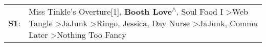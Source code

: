 \begin{supertabular}{p{0.03\textwidth}p{0.92\textwidth}}
 \textbf{S1}:  &  Miss Tinkle's Overture[1]\textsuperscript{}, \enspace \textbf{Booth Love\textsuperscript{$\wedge$}}, \enspace Soul Food I\textsuperscript{} \textgreater \enspace Web Tangle\textsuperscript{} \textgreater \enspace JaJunk\textsuperscript{} \textgreater \enspace Ringo\textsuperscript{}, \enspace Jessica\textsuperscript{}, \enspace Day Nurse\textsuperscript{} \textgreater \enspace JaJunk\textsuperscript{}, \enspace Comma Later\textsuperscript{} \textgreater \enspace Nothing Too Fancy\textsuperscript{}  \enspace  \\
\end{supertabular}
